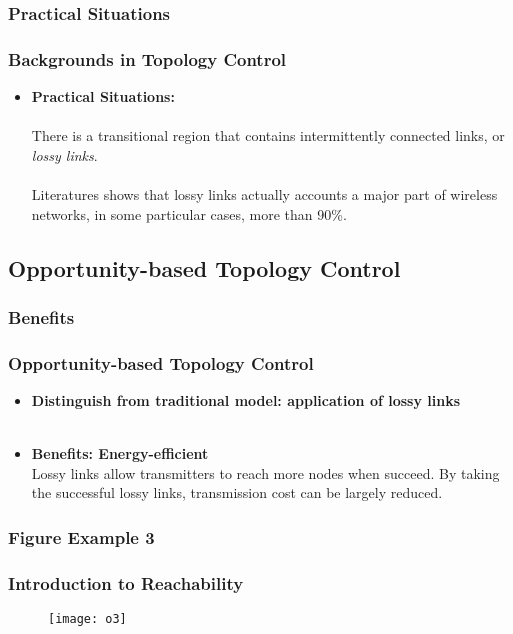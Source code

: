 \documentclass[xcolor=dvipsnames]{beamer}
\begin{document}
\subsubsection{Practical Situations}
\begin{frame}
\frametitle{Backgrounds in Topology Control}
\begin{itemize}
\item \textbf{Practical Situations:}\\
\indent\\
There is a transitional region that contains intermittently connected links, or \textit{lossy links}.\\
\indent\\
Literatures shows that lossy links actually accounts a major part of wireless networks, in some particular cases, more than 90\%.
\end{itemize}
\end{frame}

\subsection{Opportunity-based Topology Control}
\subsubsection{Benefits}
\begin{frame}
\frametitle{Opportunity-based Topology Control}
\begin{itemize}
\item \textbf{Distinguish from traditional model: application of lossy links}\\
\indent\\
\item \textbf{Benefits: Energy-efficient}\\
Lossy links allow transmitters to reach more nodes when succeed. By taking the successful lossy links, transmission cost can be largely reduced.
\end{itemize}
\end{frame}

\subsubsection{Figure Example 3}
\begin{frame}
\frametitle{Introduction to Reachability}
\begin{figure}
\begin{center}
  \texttt{[image: o3]}
\end{center}
\end{figure}
\end{frame}
\end{document}
